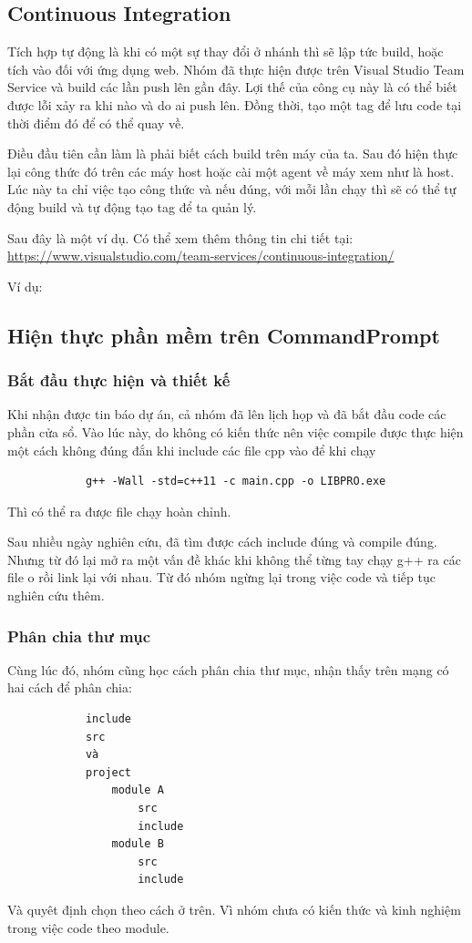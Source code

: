 \documentclass[12pt,a4paper]{report}
\begin{document}
            \subsection{Continuous Integration}

            Tích hợp tự động là khi có một sự thay đổi ở nhánh thì sẽ lập tức build, hoặc tích vào đối với ứng dụng web. Nhóm đã thực hiện được trên Visual Studio Team Service và build các lần push lên gần đây. Lợi thế của công cụ này là có thể biết được lỗi xảy ra khi nào và do ai push lên. Đồng thời, tạo một tag để lưu code tại thời điểm đó để có thể quay về. \par

            Điều đầu tiên cần làm là phải biết cách build trên máy của ta. Sau đó hiện thực lại công thức đó trên các máy host hoặc cài một agent về máy xem như là host. Lúc này ta chỉ việc tạo công thức và nếu đúng, với mỗi lần chạy thì sẽ có thể tự động build và tự động tạo tag để ta quản lý.\par

            Sau đây là một ví dụ. Có thể xem thêm thông tin chi tiết tại: \url{https://www.visualstudio.com/team-services/continuous-integration/}\par

            Ví dụ:
        \subsection{Hiện thực phần mềm trên CommandPrompt}
            \subsubsection{Bắt đầu thực hiện và thiết kế}
            Khi nhận được tin báo dự án, cả nhóm đã lên lịch họp và đã bắt đầu code các phần cửa sổ. Vào lúc này, do không có kiến thức nên việc compile được thực hiện một cách không đúng đắn khi include các file cpp vào để khi chạy
            \begin{verbatim}
            g++ -Wall -std=c++11 -c main.cpp -o LIBPRO.exe
            \end{verbatim}
            Thì có thể ra được file chạy hoàn chỉnh.\par

            Sau nhiều ngày nghiên cứu, đã tìm được cách include đúng và compile đúng. Nhưng từ đó lại mở ra một vấn đề khác khi không thể từng tay chạy g++ ra các file o rồi link lại với nhau. Từ đó nhóm ngừng lại trong việc code và tiếp tục nghiên cứu thêm.
            \subsubsection{Phân chia thư mục}
            Cùng lúc đó, nhóm cũng học cách phân chia thư mục, nhận thấy trên mạng có hai cách để phân chia:
            \begin{verbatim}
            include
            src
            và
            project
                module A
                    src
                    include
                module B
                    src
                    include
            \end{verbatim}
            Và quyêt định chọn theo cách ở trên. Vì nhóm chưa có kiến thức và kinh nghiệm trong việc code theo module.
\end{document}
